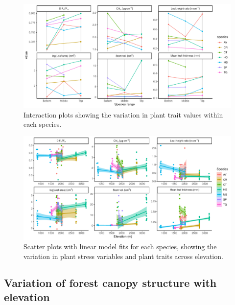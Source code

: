 \documentclass[a4paper, 11pt]{article}
\begin{document}
\begin{figure}[H]
\includegraphics[width=\textwidth]{spaghetti}
\centering
\caption{Interaction plots showing the variation in plant trait values within each species.}
\label{spaghetti}
\end{figure}

\begin{figure}[H]
\includegraphics[width=\textwidth]{traits_elev_scatter}
\centering
\caption{Scatter plots with linear model fits for each species, showing the variation in plant stress variables and plant traits across elevation.}
\label{traits_elev_scatter}
\end{figure}

\subsection{Variation of forest canopy structure with elevation}
\end{document}
